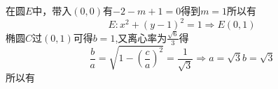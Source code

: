 在圆$E$中，带入$(0,0)$有$-2-m+1=0$得到$m=1$所以有
\begin{equation}
E:{x^2} + {\left( {y - 1} \right)^2} = 1 \Rightarrow E\left( {0,1} \right)
\end{equation}
椭圆$C$过$(0,1)$可得$b=1$,又离心率为$\frac{{\sqrt 6 }}{3}$得
\begin{equation}
\frac{b}{a} = \sqrt {1 - {{\left( {\frac{c}{a}} \right)}^2}}  = \frac{1}{{\sqrt 3 }} \Rightarrow a = \sqrt 3 b = \sqrt 3
\end{equation}
所以有